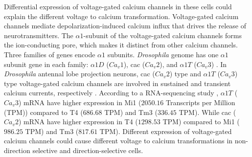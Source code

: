 Differential expression of voltage-gated calcium channels in these cells could explain the different voltage to calcium transformation. Voltage-gated calcium channels mediate depolarization-induced calcium influx that drives the release of neurotransmitters. The $\alpha1$-subunit of the voltage-gated calcium channels forms the ion-conducting pore, which makes it distinct from other calcium channels. Three families of genes encode $\alpha1$ subunits. \textit{Drosophila} genome has one $\alpha1$ subunit gene in each family: $\alpha1D$ ($Ca_{v}1$), cac ($Ca_{v}2$), and $\alpha1T$ ($Ca_{v}3$) \parencite{Littleton2000, King2007}. In \textit{Drosophila} antennal lobe projection neurons, cac ($Ca_{v}2$) type and $\alpha1T$ ($Ca_{v}3$) type voltage-gated calcium channels are involved in sustained and transient calcium currents, respectively \parencite{Gu2009, Iniguez2013}. According to a RNA-sequencing study \parencite{Davis2020}, $\alpha1T$ ($Ca_{v}3$) mRNA have higher expression in Mi1 ($2050.16$ Transcripts per Million (TPM)) compared to T4 ($686.68$ TPM) and Tm3 ($336.45$ TPM). While cac ($Ca_{v}2$) mRNA have higher expression in T4 ($1298.53$ TPM) compared to Mi1 ($986.25$ TPM) and Tm3 ($817.61$ TPM). Different expression of voltage-gated calcium channels could cause different voltage to calcium transformations in non-direction selective and direction-selective cells.



